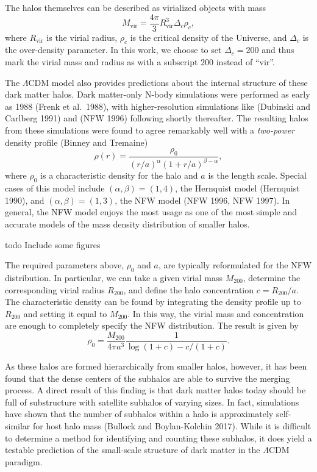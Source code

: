 The halos themselves can be described as virialized objects with mass
\[ M_{\text{vir}} = \frac{4\pi}{3} R_{\text{vir}}^3 \Delta_c \rho_c, \]
where \(R_{\text{vir}}\) is the virial radius, \(\rho_c\) is the
critical density of the Universe, and \(\Delta_c\) is the over-density
parameter. In this work, we choose to set \(\Delta_c = 200\) and thus
mark the virial mass and radius as with a subscript 200 instead of
``vir''.

The \(\Lambda\)CDM model also provides predictions about the internal
structure of these dark matter halos. Dark matter-only N-body
simulations were performed as early as 1988 (Frenk et al.~1988), with
higher-resolution simulations like (Dubinski and Carlberg 1991) and (NFW
1996) following shortly thereafter. The resulting halos from these
simulations were found to agree remarkably well with a \emph{two-power}
density profile (Binney and Tremaine)
\[ \rho(r) = \frac{\rho_0}{(r/a)^\alpha (1 + r/a)^{\beta-\alpha}}, \]
where \(\rho_0\) is a characteristic density for the halo and \(a\) is
the length scale. Special cases of this model include
\((\alpha,\beta) = (1,4)\), the Hernquist model (Hernquist 1990), and
\((\alpha,\beta) = (1,3)\), the NFW model (NFW 1996, NFW 1997). In
general, the NFW model enjoys the most usage as one of the most simple
and accurate models of the mass density distribution of smaller halos.

todo Include some figures

The required parameters above, \(\rho_0\) and \(a\), are typically
reformulated for the NFW distribution. In particular, we can take a
given virial mass \(M_{200}\), determine the corresponding virial radius
\(R_{200}\), and define the halo concentration \(c = R_{200} / a\). The
characteristic density can be found by integrating the density profile
up to \(R_{200}\) and setting it equal to \(M_{200}\). In this way, the
virial mass and concentration are enough to completely specify the NFW
distribution. The result is given by
\[ \rho_0 = \frac{M_{200}}{4 \pi a^3} \frac{1}{\log(1+c) - c/(1+c)}. \]

As these halos are formed hierarchically from smaller halos, however, it
has been found that the dense centers of the subhalos are able to
survive the merging process. A direct result of this finding is that
dark matter halos today should be full of substructure with satellite
subhalos of varying sizes. In fact, simulations have shown that the
number of subhalos within a halo is approximately self-similar for host
halo mass (Bullock and Boylan-Kolchin 2017). While it is difficult to
determine a method for identifying and counting these subhalos, it does
yield a testable prediction of the small-scale structure of dark matter
in the \(\Lambda\)CDM paradigm.

